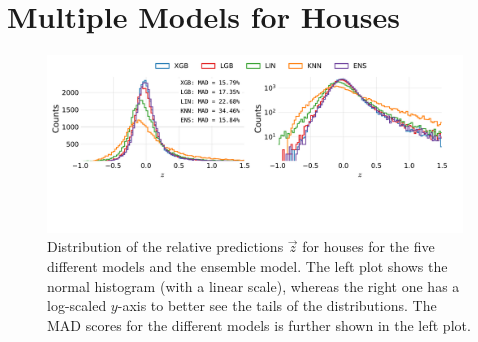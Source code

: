 \FloatBarrier
\section{Multiple Models for Houses}

\begin{figure}[ht!]
  \centerfloat
  \includegraphics[draft=false, width=0.98\textwidth, trim=10 130 40 10, clip]{figures/housing/Villa_v19_cut_all_Ncols_all_all_models.pdf}
  \caption[Performance Comparison of Multiple Models for Houses]
          {Distribution of the relative predictions $\vec{z}$ for houses for the five different models and the ensemble model. The left plot shows the normal histogram (with a linear scale), whereas the right one has a log-scaled $y$-axis to better see the tails of the distributions. The MAD scores for the different models is further shown in the left plot.} 
  \label{fig:h:multiple_models_villa}
\end{figure}
